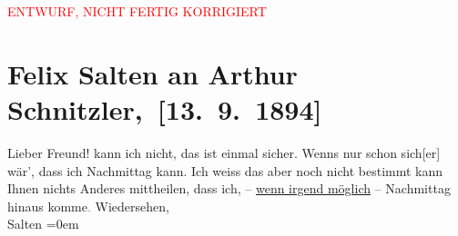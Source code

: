 
\begin{center}
            \textcolor{red}{ENTWURF, NICHT FERTIG KORRIGIERT}
                      \end{center}
            
         
         \renewcommand{\erwaehntePersonen}{Personen: Felix Salten}
         \renewcommand{\erwaehnteOrte}{Orte: Wien}
         \renewcommand{\erwaehnteWerke}{}
               \section[ Felix Salten an Arthur Schnitzler, {[}13. 9. 1894{]}]{ Felix Salten an Arthur Schnitzler, {[}13. 9. 1894{]}}\nopagebreak{}\rehead{ }\begin{ledgroupsized}[t]{13cm}\normalsize\beginnumbering{} \toendnotes[C]{\smallbreak\pagebreak[2]} 
\toendnotes[C]{\smallbreak}\pstart{}{\pb}Lieber Freund!\pend\pstart
           \label{K_L03146-1v}\label{K_L03146-1h} kann ich nicht, das
               ist einmal sicher. Wenns nur schon sich{[}er{]} wär’, dass ich
                  Nachmittag kann. Ich weiss das aber noch nicht bestimmt {\kaufmannsund} kann Ihnen nichts {\pb}Anderes mittheilen, dass ich, –
                  \uline{wenn irgend möglich} – Nachmittag
               hinaus komme\textcolor{gray}{.}\pend
           \pstart
           Wiedersehen, {\\[\baselineskip]}\spacefill\mbox{Salten}\pend
           \leftskip=0em{}
         
         \endnumbering{}\end{ledgroupsized}  \newcommand{\dateiname}{L03146}\newcommand{\titel}{Felix Salten an Arthur Schnitzler, [13. 9. 1894]}\newcommand{\editorInnen}{Martin Anton Müller und Laura Untner}
      